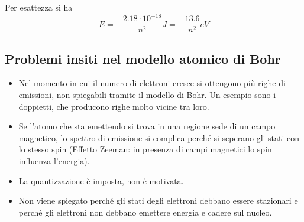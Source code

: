 Per esattezza si ha
$$E=-\frac{2.18\cdot10^{-18}}{n^2}J=-\frac{13.6}{n^2}eV$$
\subsection{Problemi insiti nel modello atomico di Bohr}
\begin{itemize}
  \item Nel momento in cui il numero di elettroni cresce si ottengono più righe di emissioni, non spiegabili tramite il modello di Bohr. Un esempio sono i doppietti, che producono righe molto vicine tra loro.
  \item Se l'atomo che sta emettendo si trova in una regione sede di un campo magnetico, lo spettro di emissione si complica perché si seperano gli stati con lo stesso spin
  (Effetto Zeeman: in presenza di campi magnetici lo spin influenza l'energia).
  \item La quantizzazione è imposta, non è motivata.
  \item Non viene spiegato perché gli stati degli elettroni debbano essere stazionari e perché gli elettroni non debbano emettere energia e cadere sul nucleo.
\end{itemize}